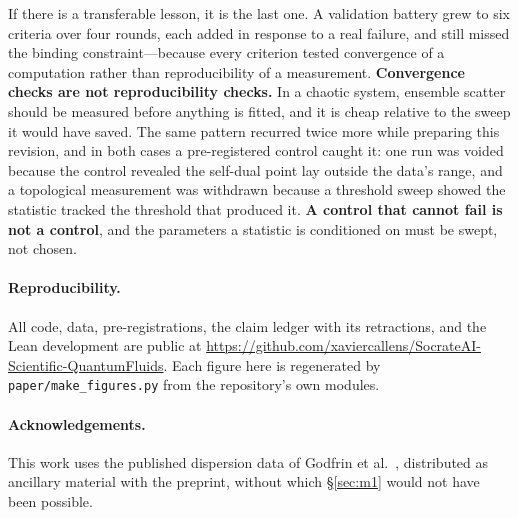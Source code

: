 \documentclass[11pt,a4paper]{article}
\theoremstyle{definition}
\theoremstyle{remark}
\begin{document}
If there is a transferable lesson, it is the last one. A validation battery grew to six
criteria over four rounds, each added in response to a real failure, and still missed the
binding constraint---because every criterion tested convergence of a computation rather
than reproducibility of a measurement. \textbf{Convergence checks are not reproducibility
checks.} In a chaotic system, ensemble scatter should be measured before anything is fitted,
and it is cheap relative to the sweep it would have saved. The same pattern recurred twice
more while preparing this revision, and in both cases a pre-registered control caught it: one
run was voided because the control revealed the self-dual point lay outside the data's range,
and a topological measurement was withdrawn because a threshold sweep showed the statistic
tracked the threshold that produced it. \textbf{A control that cannot fail is not a control},
and the parameters a statistic is conditioned on must be swept, not chosen.

\paragraph{Reproducibility.} All code, data, pre-registrations, the claim ledger with its
retractions, and the Lean development are public at
\url{https://github.com/xaviercallens/SocrateAI-Scientific-QuantumFluids}. Each figure here
is regenerated by \texttt{paper/make\_figures.py} from the repository's own modules.

\paragraph{Acknowledgements.} This work uses the published dispersion data of
Godfrin et al.~\cite{Godfrin2021}, distributed as ancillary material with the preprint,
without which \S\ref{sec:m1} would not have been possible.



\end{document}
